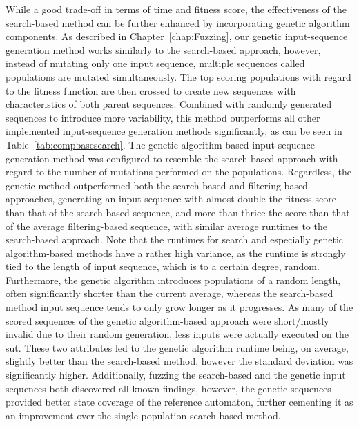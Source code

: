 While a good trade-off in terms of time and fitness score, the effectiveness of the search-based method can be further enhanced by incorporating genetic algorithm components. As described in Chapter~\ref{chap:Fuzzing}, our genetic input-sequence generation method works similarly to the search-based approach, however, instead of mutating only one input sequence, multiple sequences called populations are mutated simultaneously. The top scoring populations with regard to the fitness function are then crossed to create new sequences with characteristics of both parent sequences. Combined with randomly generated sequences to introduce more variability, this method outperforms all other implemented input-sequence generation methods significantly, as can be seen in Table~\ref{tab:compbasesearch}. The genetic algorithm-based input-sequence generation method was configured to resemble the search-based approach with regard to the number of mutations performed on the populations. Regardless, the genetic method outperformed both the search-based and filtering-based approaches, generating an input sequence with almost double the fitness score than that of the search-based sequence, and more than thrice the score than that of the average filtering-based sequence, with similar average runtimes to the search-based approach. Note that the runtimes for search and especially genetic algorithm-based methods have a rather high variance, as the runtime is strongly tied to the length of input sequence, which is to a certain degree, random. Furthermore, the genetic algorithm introduces populations of a random length, often significantly shorter than the current average, whereas the search-based method input sequence tends to only grow longer as it progresses. As many of the scored sequences of the genetic algorithm-based approach were short/mostly invalid due to their random generation, less inputs were actually executed on the \ac{sut}. These two attributes led to the genetic algorithm runtime being, on average, slightly better than the search-based method, however the standard deviation was significantly higher. Additionally, fuzzing the search-based and the genetic input sequences both discovered all known findings, however, the genetic sequences provided better state coverage of the reference automaton, further cementing it as an improvement over the single-population search-based method.
\newpage

